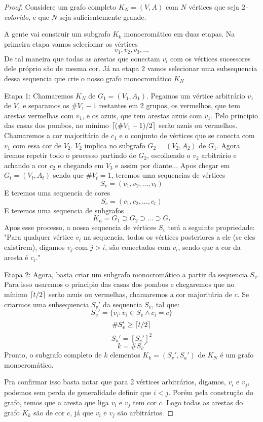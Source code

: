\documentclass{article}
\DeclarePairedDelimiter\ceil{\lceil}{\rceil}
\begin{document}
\begin{proof}
    Considere um grafo completo $K_N = (V,A)$ com $N$ vértices que seja $2$\emph{-colorido}, e que $N$ seja suficientemente grande.

    A gente vai construir um subgrafo $K_k$ monocromático em duas etapas. Na primeira etapa vamos selecionar os vértices
    \[v_1, v_2, v_3, ...\]
    De tal maneira que todas as arestas que conectam $v_i$ com os vértices sucessores dele próprio são de mesma cor. Já na etapa 2 vamos selecionar uma subsequencia dessa sequencia que crie o nosso grafo monocromático $K_N$

    Etapa 1:
    Chamaremos $K_N$ de $G_1 = (V_1, A_1)$. Pegamos um vértice arbitrário $v_1$ de $V_1$ e separamos os $\#V_1-1$ restantes em 2 grupos, os vermelhos, que tem arestas vermelhas com $v_1$, e os azuis, que tem arestas azuis com $v_1$.
    Pelo principio das casas dos pombos, no mínimo $\ceil{(\#V_1-1)/2}$ serão azuis ou vermelhos. Chamaremos a cor majoritária de $c_1$ e o conjunto de vértices que se conecta com $v_1$ com essa cor de $V_2$.
    $V_2$ implica no subgrafo $G_2 = (V_2, A_2)$ de $G_1$. Agora iremos repetir todo o processo partindo de $G_2$, escolhendo o $v_2$ arbitrário e achando a cor $c_2$ e chegando em $V_3$ e assim por diante...
    Apos chegar em $G_t = (V_t,A_t)$ sendo que $\#V_t = 1$, teremos uma sequencias de vértices
    \[S_v = (v_1, v_2, ..., v_t)\]
    E teremos uma sequencia de cores
    \[S_c = (c_1, c_2, ..., c_t)\]
    E teremos uma sequencia de subgrafos
    \[K_n = G_1 \supset G_2 \supset ... \supset G_t\]
    Apos esse processo, a nossa sequencia de vértices $S_v$ terá a seguinte propriedade: "Para qualquer vértice $v_i$ na sequencia, todos os vértices posteriores a ele (se eles existirem), digamos $v_j$ com $j > i$, são conectados com $v_i$, sendo que a cor da aresta é $c_i$."

    Etapa 2:
    Agora, basta criar um subgrafo monocromático a partir da sequencia $S_v$. Para isso usaremos o principio das casas dos pombos e chegaremos que no mínimo $\ceil{t/2}$ serão azuis ou vermelhas, chamaremos a cor majoritária de $c$. Se criarmos uma subsequencia $S_v'$ da sequencia $S_v$, tal que:
    \[S_v' = \{v_i: v_i \in S_v \wedge c_i = c\}\]
    \[\#S_v' \ge \ceil{t/2}\]
    \[S_a' = [S_v']^2\]
    \[k = \#S_v'\]
    Pronto, o subgrafo completo de $k$ elementos $K_k = (S_v', S_a')$ de $K_N$ é um grafo monocromático.

    Pra confirmar isso basta notar que para 2 vértices arbitrários, digamos, $v_i$ e $v_j$, podemos sem perda de generalidade definir que $i < j$. Porém pela construção do grafo, temos que a aresta que liga $v_i$ e $v_j$ tem cor $c$. Logo todas as arestas do grafo $K_k$ são de cor $c$, já que $v_i$ e $v_j$ são arbitrários.


\end{proof}
\end{document}
